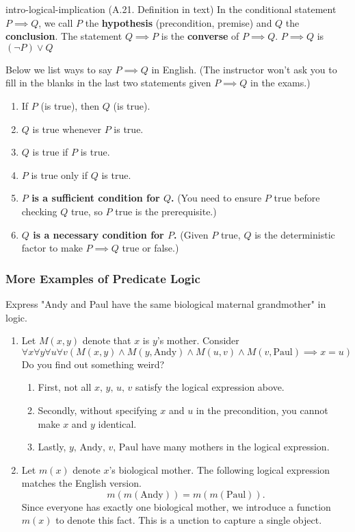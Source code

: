 \documentclass[../src/handouts/main.tex]{subfiles}
\begin{document}
\begin{definition}{}{intro-logical-implication}
  (A.21. Definition in text) In the conditional statement $P \implies Q$, we call $P$ the \textbf{hypothesis} (precondition, premise) and $Q$ the \textbf{conclusion}. The statement $Q \implies P$ is the \textbf{converse} of $P \implies Q$. $P \implies Q$ is $(\neg P) \lor Q$

  Below we list ways to say $P \implies Q$ in English. (The instructor won't ask you to fill in the blanks in the last two statements given $P \implies Q$ in the exams.)
  \begin{enumerate}
    \item If $P$ (is true), then $Q$ (is true).
    \item $Q$ is true whenever $P$ is true.
    \item $Q$ is true if $P$ is true.
    \item $P$ is true only if $Q$ is true.
    \item \textbf{$P$ is a sufficient condition for $Q$.} (You need to ensure $P$ true before checking $Q$ true, so $P$ true is the prerequisite.)
    \item \textbf{$Q$ is a necessary condition for $P$.} (Given $P$ true, $Q$ is the deterministic factor to make $P \implies Q$ true or false.)
  \end{enumerate}
\end{definition}

\subsubsection{More Examples of Predicate Logic}

Express "Andy and Paul have the same biological maternal grandmother" in logic.
\begin{enumerate}
  \item Let $M(x, y)$ denote that $x$ is $y$'s mother. Consider
        $$
          \forall x \forall y \forall u \forall v(M(x, y) \land M(y, \text{Andy}) \land M(u, v) \land M(v, \text{Paul}) \implies x = u)
        $$
        Do you find out something weird?
        \begin{enumerate}
          \item First, not all $x,\, y,\, u,\, v$ satisfy the logical expression above.
          \item Secondly, without specifying $x$ and $u$ in the precondition, you cannot make $x$ and $y$ identical.
          \item Lastly, $y,\, \text{Andy},\, v,\, \text{Paul}$ have many mothers in the logical expression.
        \end{enumerate}
  \item Let $m(x)$ denote $x$'s biological mother. The following logical expression matches the English version.
        $$
          m(m(\text{Andy}))=m(m(\text{Paul})).
        $$
        Since everyone has exactly one biological mother, we introduce a function $m(x)$ to denote this fact. This is a unction to capture a single object.
\end{enumerate}
\end{document}
